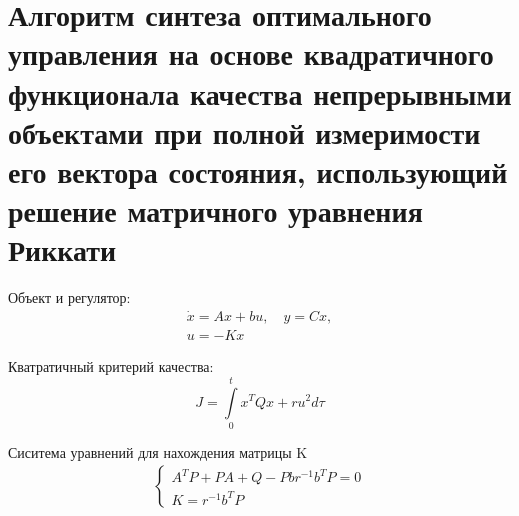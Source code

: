 \section{Алгоритм 	синтеза оптимального управления на основе квадратичного функционала 	качества непрерывными объектами при полной измеримости его вектора состояния, использующий решение матричного уравнения Риккати}

Объект и регулятор:
\begin{gather}
    \dot x = A x + b u, \quad y = C x,\\
    u = -K x
\end{gather}

Кватратичный критерий качества:
\begin{equation}
    J = \int\limits_{0}^{t} x^T Q x + r u^2 d\tau
\end{equation}

Сиситема уравнений для нахождения матрицы K
\begin{gather}
    \begin{cases}
        A^T P + PA + Q - P b r^{-1} b^T P = 0\\
        K = r^{-1} b^T P
    \end{cases}
\end{gather}